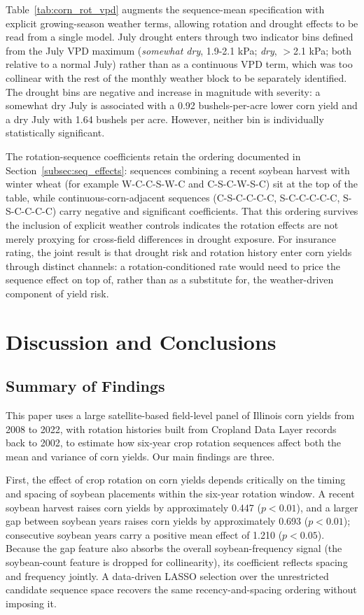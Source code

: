 \documentclass[12pt,letterpaper]{article}
\theoremstyle{remark}
\theoremstyle{remark}
\theoremstyle{plain}
\theoremstyle{definition}
\begin{document}
Table~\ref{tab:corn_rot_vpd} augments the sequence-mean specification with explicit growing-season weather terms, allowing rotation and drought effects to be read from a single model. July drought enters through two indicator bins defined from the July VPD maximum (\emph{somewhat dry}, 1.9-2.1 kPa; \emph{dry}, $>$2.1 kPa; both relative to a normal July) rather than as a continuous VPD term, which was too collinear with the rest of the monthly weather block to be separately identified. The drought bins are negative and increase in magnitude with severity: a somewhat dry July is associated with a 0.92 bushels-per-acre lower corn yield and a dry July with 1.64 bushels per acre. However, neither bin is individually statistically significant.

The rotation-sequence coefficients retain the ordering documented in Section~\ref{subsec:seq_effects}: sequences combining a recent soybean harvest with winter wheat (for example W-C-C-S-W-C and C-S-C-W-S-C) sit at the top of the table, while continuous-corn-adjacent sequences (C-S-C-C-C-C, S-C-C-C-C-C, S-S-C-C-C-C) carry negative and significant coefficients. That this ordering survives the inclusion of explicit weather controls indicates the rotation effects are not merely proxying for cross-field differences in drought exposure. For insurance rating, the joint result is that drought risk and rotation history enter corn yields through distinct channels: a rotation-conditioned rate would need to price the sequence effect on top of, rather than as a substitute for, the weather-driven component of yield risk.

\section{\label{sec:conclusions}Discussion and Conclusions}

\subsection{\label{susec:summary}Summary of Findings}

This paper uses a large satellite-based field-level panel of Illinois corn yields from 2008 to 2022, with rotation histories built from Cropland Data Layer records back to 2002, to estimate how six-year crop rotation sequences affect both the mean and variance of corn yields. Our main findings are three.

First, the effect of crop rotation on corn yields depends critically on the timing and spacing of soybean placements within the six-year rotation window. A recent soybean harvest raises corn yields by approximately 0.447 ($p<0.01$), and a larger gap between soybean years raises corn yields by approximately 0.693 ($p<0.01$); consecutive soybean years carry a positive mean effect of 1.210 ($p<0.05$). Because the gap feature also absorbs the overall soybean-frequency signal (the soybean-count feature is dropped for collinearity), its coefficient reflects spacing and frequency jointly. A data-driven LASSO selection over the unrestricted candidate sequence space recovers the same recency-and-spacing ordering without imposing it.
\end{document}
